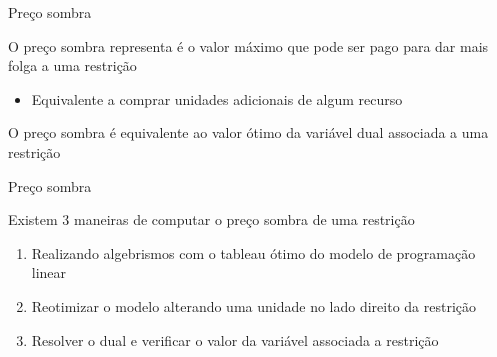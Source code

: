 \documentclass[compress,mathserif]{beamer}
\begin{document}

\begin{frame}{Preço sombra}

O preço sombra representa é o valor máximo que pode ser pago para dar mais folga a uma restrição
\begin{itemize}
    \item Equivalente a comprar unidades adicionais de algum recurso 
\end{itemize}

\vspace{0.5cm}

O preço sombra é equivalente ao valor ótimo da variável dual associada a uma restrição

\end{frame}


\begin{frame}{Preço sombra}

Existem 3 maneiras de computar o preço sombra de uma restrição
\begin{enumerate}
    \item Realizando algebrismos com o tableau ótimo do modelo de programação linear
    \item Reotimizar o modelo alterando uma unidade no lado direito da restrição
    \item Resolver o dual e verificar o valor da variável associada a restrição
\end{enumerate}

\end{frame}
\end{document}
